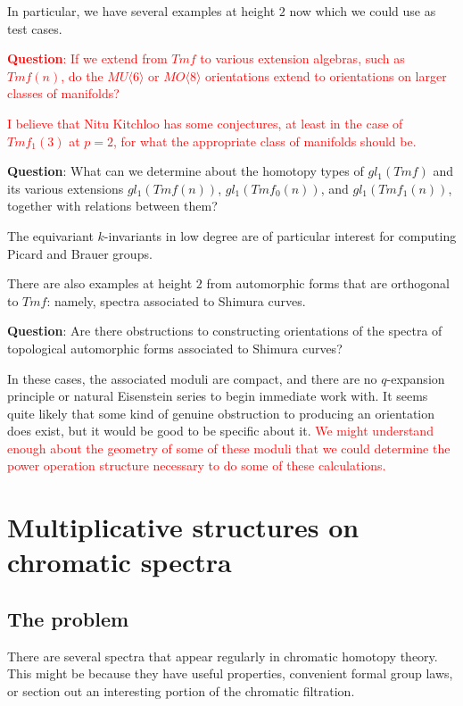 \documentclass[12pt,titlepage]{article}
\newcommand{\rd}[1]{{\textcolor{red}{#1}}}
\theoremstyle{plain}
\theoremstyle{definition}
\theoremstyle{remark}
\begin{document}
In particular, we have several examples at height $2$ now which we could use as test cases.

\rd{\textbf{Question}: If we extend from $Tmf$ to various extension algebras, such as $Tmf(n)$, do the $MU\langle 6\rangle$ or $MO\langle
8\rangle$ orientations extend to orientations on larger classes of manifolds?}

\rd{I believe that Nitu Kitchloo has some conjectures, at least in the case of $Tmf_1(3)$ at $p=2$, for what the appropriate class of manifolds should be.}

\textbf{Question}: What can we determine about the homotopy types of $gl_1(Tmf)$ and its various extensions $gl_1(Tmf(n))$, $gl_1(Tmf_0(n))$, and $gl_1(Tmf_1(n))$, together with relations between them?

The equivariant $k$-invariants in low degree are of particular interest for computing Picard and Brauer groups.

There are also examples at height $2$ from automorphic forms that are orthogonal to $Tmf$: namely, spectra associated to Shimura curves.

\textbf{Question}: Are there obstructions to constructing orientations of the spectra of topological automorphic forms associated to Shimura curves?

In these cases, the associated moduli are compact, and there are no $q$-expansion principle or natural Eisenstein series to begin immediate work with. It seems quite likely that some kind of genuine obstruction to producing an orientation does exist, but it would be good to be specific about it. \rd{We might understand enough about the geometry of some of these moduli that we could determine the power operation structure necessary to do some of these calculations.}

\section{Multiplicative structures on chromatic spectra}

\hypertarget{the_problem_1}{}\subsection{{The problem}}\label{the_problem_1}

There are several spectra that appear regularly in chromatic homotopy theory. This might be because they have useful properties, convenient formal group laws, or section out an interesting portion of the chromatic filtration.
\end{document}
